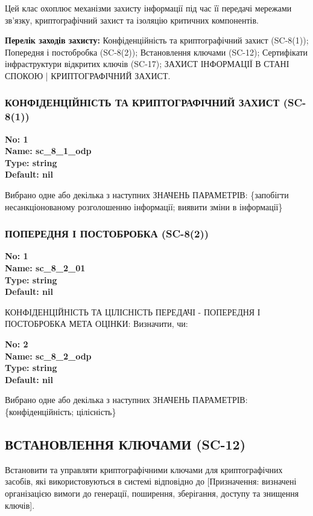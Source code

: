 \documentclass{article}
\begin{document}
Цей клас охоплює механізми захисту інформації під час її передачі мережами зв'язку, криптографічний захист та ізоляцію критичних компонентів.

\textbf{Перелік заходів захисту:} Конфіденційність та криптографічний захист (SC-8(1)); Попередня і постобробка (SC-8(2)); Встановлення ключами (SC-12); Сертифікати інфраструктури відкритих ключів (SC-17); ЗАХИСТ ІНФОРМАЦІЇ В СТАНІ СПОКОЮ | КРИПТОГРАФІЧНИЙ ЗАХИСТ.

\subsubsection{КОНФІДЕНЦІЙНІСТЬ ТА КРИПТОГРАФІЧНИЙ ЗАХИСТ (SC-8(1))}


\vspace{10pt}
{\footnotesize\bfseries
No: 1\\
Name: sc\_\allowbreak{}8\_\allowbreak{}1\_\allowbreak{}odp\\
Type: string\\
Default: nil
}

{\footnotesize Вибрано одне або декілька з наступних ЗНАЧЕНЬ ПАРАМЕТРІВ: \{запобігти несанкціонованому розголошенню інформації; виявити зміни в інформації\}}




\subsubsection{ПОПЕРЕДНЯ І ПОСТОБРОБКА (SC-8(2))}


\vspace{10pt}
{\footnotesize\bfseries
No: 1\\
Name: sc\_\allowbreak{}8\_\allowbreak{}2\_\allowbreak{}01\\
Type: string\\
Default: nil
}

{\footnotesize КОНФІДЕНЦІЙНІСТЬ ТА ЦІЛІСНІСТЬ ПЕРЕДАЧІ - ПОПЕРЕДНЯ І ПОСТОБРОБКА МЕТА ОЦІНКИ: Визначити, чи:}


{\footnotesize\bfseries
No: 2\\
Name: sc\_\allowbreak{}8\_\allowbreak{}2\_\allowbreak{}odp\\
Type: string\\
Default: nil
}

{\footnotesize Вибрано одне або декілька з наступних ЗНАЧЕНЬ ПАРАМЕТРІВ: \{конфіденційність; цілісність\}}




\subsection{ВСТАНОВЛЕННЯ КЛЮЧАМИ (SC-12)}
Встановити та управляти криптографічними ключами для криптографічних засобів, які використовуються в системі відповідно до [Призначення: визначені організацією вимоги до генерації, поширення, зберігання, доступу та знищення ключів].
\end{document}
